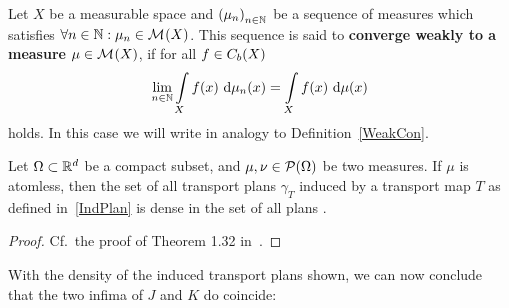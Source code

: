 \begin{definition}\label{WeakConMeas}
	Let $X$ be a measurable space and ${(\mu_n)}_{\NinN}$ be a sequence of measures which satisfies $\forall \NinN: \mu_n \in \M{X}$. This sequence is said to \textbf{converge weakly to a measure} $\mu \in \M{X}$, if for all $f \in \CF[b]{X}$ 
	\[ \lim\limits_{\NinN} \int\limits_X f(x)~\Dx{\mu_n} = \int\limits_X f(x)~\Dx{\mu} \]
	holds. In this case we will write  in analogy to Definition~\ref{WeakCon}.
\end{definition}

	


\begin{theorem}\label{IndPlansDense}
	Let $\Omega \subset \R^d$ be a compact subset, and $\mu, \nu \in \PM{\Omega}$ be two measures. If $\mu$ is atomless, then the set of all transport plans $\gamma_T$ induced by a transport map $T$ as defined in~\ref{IndPlan} is dense in the set of all plans \TP{\mu}{\nu}.
\end{theorem}

\begin{proof}
	Cf.~the proof of Theorem 1.32 in~\cite{San2015}.
\end{proof}

With the density of the induced transport plans shown, we can now conclude that the two infima of $J$ and $K$ do coincide:

